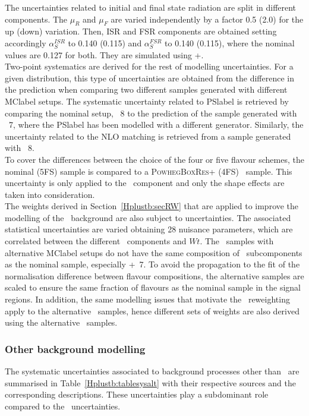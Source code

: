 The uncertainties related to initial and final state radiation are split in different components. The $\mu_R$ and $\mu_F$ are varied independently by a factor 0.5 (2.0) for the up (down) variation. Then, ISR and FSR components are obtained setting accordingly $\alpha_S^{ISR}$ to 0.140 (0.115) and $\alpha_S^{FSR}$ to 0.140 (0.115), where the nominal values are 0.127 for both. They are simulated using \POWHEGBOX+\PYTHIA.\\

Two-point systematics are derived for the rest of modelling uncertainties. For a given distribution, this type of uncertainties are obtained from the difference in the prediction when comparing two different samples generated with different \acrshort{MClabel} setups. The systematic uncertainty related to \acrshort{PSlabel} is retrieved by comparing the nominal setup, \POWHEGPYTHIA~8 to the prediction of the sample generated with \POWHEGHERWIG~7, where the \acrshort{PSlabel} has been modelled with a different generator. Similarly, the uncertainty related to the NLO matching is retrieved from a sample generated with \MGMCatNLOPYTHIA~8.\\

To cover the differences between the choice of the four or five flavour schemes, the nominal (5FS) sample is compared to a \textsc{PowhegBoxRes}+ (4FS) \ttb\ sample. This uncertainty is only applied to the \ttb\ component and only the shape effects are taken into consideration.\\

The weights derived in Section~\ref{Hplustb:secRW} that are applied to improve the modelling of the \ttbar\ background are also subject to uncertainties. The associated statistical uncertainties are varied obtaining 28 nuisance parameters, which are correlated between the different \ttbar\ components and $Wt$. The \ttbar\ samples with alternative \acrshort{MClabel} setups do not have the same composition of \ttbar\ subcomponents as the nominal sample, especially \POWHEGBOX+\HERWIG~7. To avoid the propagation to the fit of the normalisation difference between flavour compositions, the alternative samples are scaled to ensure the same fraction of flavours as the nominal sample in the signal regions. In addition, the same modelling issues that motivate the \ttbar\ reweighting apply to the alternative \ttbar\ samples, hence different sets of weights are also derived using the alternative \ttbar\ samples.\\

\subsubsection{Other background modelling}
The systematic uncertainties associated to background processes other than \ttjets\ are summarised in Table~\ref{Hplustb:tablesysalt} with their respective sources and the corresponding descriptions. These uncertainties play a subdominant role compared to the \ttbar\ uncertainties.\\


